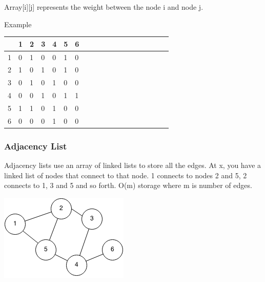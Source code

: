 \documentclass[11pt,oneside]{book}
\makeatletter
\def\maxwidth#1{\ifdim\Gin@nat@width>#1 #1\else\Gin@nat@width\fi}
\makeatother
\begin{document}
Array[i][j] represents the weight between the node i and node j.

Example

\vspace{10px}\begin{tabulary}{0.4\linewidth}{|l|l|l|l|l|l|l|l|l|l|l|l|l|l|l|l|l|l|l}\hline


   &
  1 &
  2 &
  3 &
  4 &
  5 &
  6\\
\hline


  1 &
  0 &
  1 &
  0 &
  0 &
  1 &
  0\\

  2 &
  1 &
  0 &
  1 &
  0 &
  1 &
  0\\

  3 &
  0 &
  1 &
  0 &
  1 &
  0 &
  0\\

  4 &
  0 &
  0 &
  1 &
  0 &
  1 &
  1\\

  5 &
  1 &
  1 &
  0 &
  1 &
  0 &
  0\\

  6 &
  0 &
  0 &
  0 &
  1 &
  0 &
  0\\

\hline\end{tabulary}



\subsubsection{Adjacency List}



Adjacency lists use an array of linked lists to store all the edges. At x, you have a linked list of nodes that connect to 
that node. 1 connects to nodes 2 and 5, 2 connects to 1, 3 and 5 and so forth. O(m) storage where m is number of edges.

\vspace{5px}\includegraphics[width=\maxwidth{\textwidth}]{graph.png}
\end{document}
